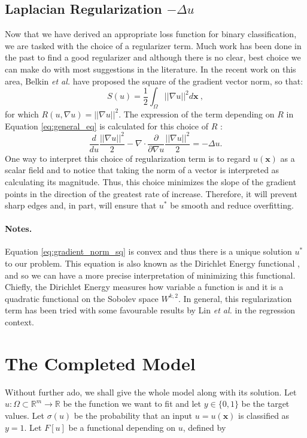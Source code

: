 \documentclass{INGUADY}
\begin{document}
\begin{body}
\subsection{Laplacian Regularization $- \Delta u$} 
Now that we have derived an appropriate loss function for binary classification, we are tasked with the choice of a regularizer term. Much work has been done in the past to find a good regularizer and although there is no clear, best choice we can make do with most suggestions in the literature. In the recent work on this area, Belkin \textit{et al.} have proposed the square of the gradient vector norm, so that:
\begin{equation} \label{eq:gradient_norm_sq}
S(u) = \dfrac{1}{2} \int_\Omega || \nabla u ||^2 d\mathbf{x} \ ,
\end{equation}
for which $R(u, \nabla u) = || \nabla u ||^2$. The expression of the term depending on $R$ in Equation \ref{eq:general_eq} is calculated for this choice of $R$
:\begin{equation} \label{eq:laplacion_reg}
\dfrac{d}{du} \dfrac{||\nabla u||^2}{2}  - \nabla \cdot  \dfrac{\partial}{\partial \nabla u}  \dfrac{||\nabla u||^2}{2} = - \Delta u.
\end{equation}
One way to interpret this choice of regularization term is to regard $u(\mathbf{x})$ as a scalar field and to notice that taking the norm of a vector is interpreted as calculating its magnitude. Thus, this choice minimizes the slope of the gradient points in the direction of the greatest rate of increase. Therefore, it will prevent sharp edges and, in part, will ensure that $u^*$ be smooth and reduce overfitting.
\paragraph{Notes.}
Equation \ref{eq:gradient_norm_sq} is convex and thus there is a unique solution $u^*$ to our problem.
This equation is also known as the Dirichlet Energy functional \cite{evans}, and so we can have a more precise interpretation of minimizing this functional. Chiefly, the Dirichlet Energy measures how variable a function is and it is a quadratic functional on the Sobolev space $W^{k,2}$. In general, this regularization term has been tried with some favourable results by Lin \textit{et al.} \cite{tonglin} in the regression context.

\section{The Completed Model}
Without further ado, we shall give the whole model along with its solution. Let $u: \Omega \subset \mathbb{R}^m \rightarrow \mathbb{R}$ be the function we want to fit and let $y \in \{ 0, 1\}$ be the target values. Let $\sigma(u)$ be the probability that an input $u = u(\mathbf{x})$ is classified as $y = 1$. Let $F[u]$ be a functional depending on $u$, defined by


\end{body}
\end{document}
